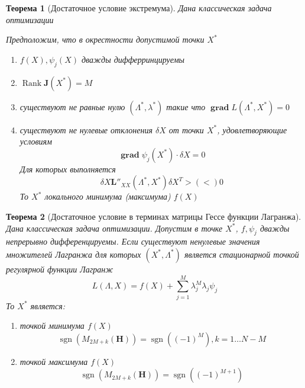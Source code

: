 \documentclass[14pt]{extarticle}
\newtheorem{theorem}{Теорема}
\DeclareMathOperator{\grad}{\textbf{grad}}
\DeclareMathOperator{\sgn}{sgn}
\DeclareMathOperator{\rank}{Rank}
\begin{document}
  \begin{theorem}[Достаточное условие экстремума]
	  Дана классическая задача оптимизации

	  Предположим, что в окрестности допустимой точки $X^{*}$
	   \begin{enumerate}
	   	\item $f(X),\psi_{j}(X)$ дважды дифферринцируемы
		\item $\rank \mathbf{J}(X^{*}) = M$
		 \item существуют не равные нулю $(\Lambda^{*},\lambda^{*})$ такие что $\grad L(\Lambda^{*},X^{*}) = 0$ 
		\item существуют не нулевые отклонения
			$\delta X$ от точки $X^{*}$, удовлетворяющие условиям
			\begin{equation}
			\grad \psi_{j}(X^{*}) \cdot \delta X = 0
			\end{equation} 
			Для которых выполняется
			\begin{equation}
				\delta X \mathbf{L}''_{XX}(\Lambda^{*},X^{*}) \delta X^{T} > (<) 0
			\end{equation} 
			То $X^{*}$ локального минимума (максимума) $f(X)$
	   \end{enumerate}
  \end{theorem}
  \begin{theorem}[Достаточное условие в терминах матрицы Гессе функции Лагранжа]
	  Дана классическая задача оптимизации.
	  Допустим в точке 
	   $X^{*}$, $f,\psi_{j}$ дважды 
	   непрерывно дифференцируемы.
	   Если существуют ненулевые 
	   значения множителей Лагранжа 
	   для которых $(X^{*},\Lambda^{*})$ 
	   является стационарной точкой регулярной функции
	   Лагранж
	   \begin{equation}
	   L(\Lambda,X) = f(X) + \sum_{j= 1}^{M} \lambda_{j}^{M}\lambda_{j} \psi_{j}
	   \end{equation} 
	   То $X^{*}$ является:
	   \begin{enumerate}
	   	\item точкой минимума $f(X)$
			 \begin{equation}
			\sgn(M_{2M +k} (\mathbf{H})) =
			\sgn((-1)^{M}), k = 1 \dots N - M
			\end{equation} 
		\item точкой максимума $f(X)$
			 \begin{equation}
			\sgn(M_{2M + k}(\mathbf{H})) =
			\sgn((-1)^{M+1})
			\end{equation} 
	   \end{enumerate}
  \end{theorem}
\end{document}
